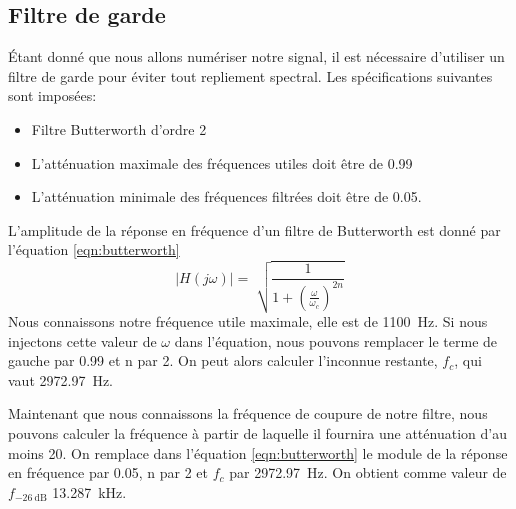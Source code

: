 \subsection{Filtre de garde}
\label{Filtre de garde}
Étant donné que nous allons numériser notre signal, il est nécessaire d'utiliser un filtre de garde pour éviter tout repliement spectral. Les spécifications suivantes sont imposées:
\begin{itemize}
\item Filtre Butterworth d'ordre 2
\item L'atténuation maximale des fréquences utiles doit être de 0.99
\item L'atténuation minimale des fréquences filtrées doit être de 0.05.
\end{itemize}
L'amplitude de la réponse en fréquence d'un filtre de Butterworth est donné par l'équation \ref{eqn:butterworth}
\begin{equation}
\vert{H(j\omega)}\vert = \sqrt[]{\frac{1}{1+(\frac{\omega}{\omega_c})^{2n}}}
\label{eqn:butterworth}
\end{equation}
Nous connaissons notre fréquence utile maximale, elle est de \SI{1100}{\hertz}. Si nous injectons cette valeur de $\omega$ dans l'équation, nous pouvons remplacer le terme de gauche par 0.99 et n par 2. On peut alors calculer  l'inconnue restante, $f_c$, qui vaut \SI{2972.97}{\hertz}.

Maintenant que nous connaissons la fréquence de coupure de notre filtre, nous pouvons calculer la fréquence à partir de laquelle il fournira une atténuation d'au moins 20. On remplace dans l'équation \ref{eqn:butterworth} le module de la réponse en fréquence par 0.05, n par 2 et $f_c$ par \SI{2972.97}{\hertz}. On obtient comme valeur de $f_{\SI{-26}{\deci\bel}}$ \SI{13.287}{\kilo\hertz}.

